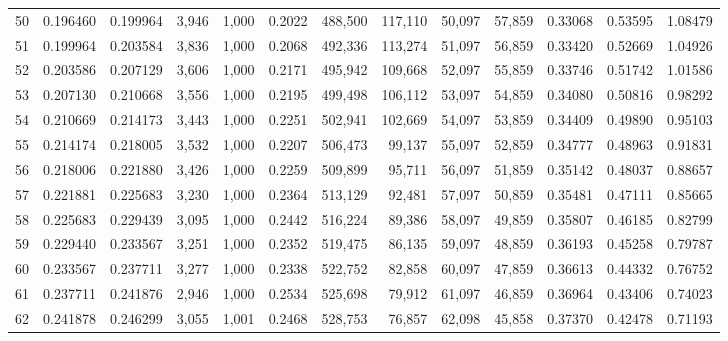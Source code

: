 \begin{tabular}{rrrrrrrrrrrrr}
50  &  0.196460 &  0.199964 &   3,946 &  1,000 &                                     0.2022 &  488,500 &  117,110 &   50,097 &   57,859 &  0.33068 &  0.53595 &  1.08479 \\
51  &  0.199964 &  0.203584 &   3,836 &  1,000 &                                     0.2068 &  492,336 &  113,274 &   51,097 &   56,859 &  0.33420 &  0.52669 &  1.04926 \\
52  &  0.203586 &  0.207129 &   3,606 &  1,000 &                                     0.2171 &  495,942 &  109,668 &   52,097 &   55,859 &  0.33746 &  0.51742 &  1.01586 \\
53  &  0.207130 &  0.210668 &   3,556 &  1,000 &                                     0.2195 &  499,498 &  106,112 &   53,097 &   54,859 &  0.34080 &  0.50816 &  0.98292 \\
54  &  0.210669 &  0.214173 &   3,443 &  1,000 &                                     0.2251 &  502,941 &  102,669 &   54,097 &   53,859 &  0.34409 &  0.49890 &  0.95103 \\
55  &  0.214174 &  0.218005 &   3,532 &  1,000 &                                     0.2207 &  506,473 &   99,137 &   55,097 &   52,859 &  0.34777 &  0.48963 &  0.91831 \\
56  &  0.218006 &  0.221880 &   3,426 &  1,000 &                                     0.2259 &  509,899 &   95,711 &   56,097 &   51,859 &  0.35142 &  0.48037 &  0.88657 \\
57  &  0.221881 &  0.225683 &   3,230 &  1,000 &                                     0.2364 &  513,129 &   92,481 &   57,097 &   50,859 &  0.35481 &  0.47111 &  0.85665 \\
58  &  0.225683 &  0.229439 &   3,095 &  1,000 &                                     0.2442 &  516,224 &   89,386 &   58,097 &   49,859 &  0.35807 &  0.46185 &  0.82799 \\
59  &  0.229440 &  0.233567 &   3,251 &  1,000 &                                     0.2352 &  519,475 &   86,135 &   59,097 &   48,859 &  0.36193 &  0.45258 &  0.79787 \\
60  &  0.233567 &  0.237711 &   3,277 &  1,000 &                                     0.2338 &  522,752 &   82,858 &   60,097 &   47,859 &  0.36613 &  0.44332 &  0.76752 \\
61  &  0.237711 &  0.241876 &   2,946 &  1,000 &                                     0.2534 &  525,698 &   79,912 &   61,097 &   46,859 &  0.36964 &  0.43406 &  0.74023 \\
62  &  0.241878 &  0.246299 &   3,055 &  1,001 &                                     0.2468 &  528,753 &   76,857 &   62,098 &   45,858 &  0.37370 &  0.42478 &  0.71193 \\

\end{tabular}
